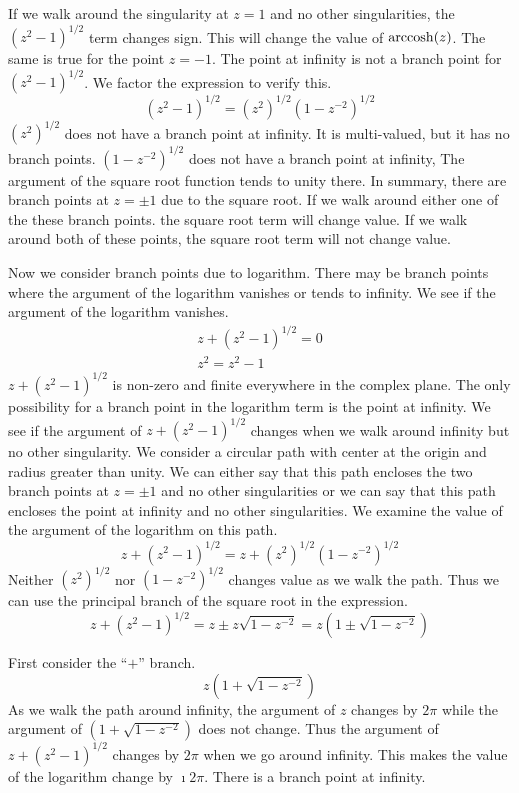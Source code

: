{\begin{Solution}
\begin{enumerate}
  If we walk around the singularity at $z = 1$ and no other singularities,
  the $\left( z^2 - 1 \right)^{1/2}$ term changes sign.  This will change the
  value of $\mathop{\mathrm{arccosh}}\nolimits(z)$.  The same is true for the point $z = -1$.
  The point at infinity is not a branch point for $\left( z^2 - 1 \right)^{1/2}$.
  We factor the expression to verify this.
  \[
  \left( z^2 - 1 \right)^{1/2}
  = \left( z^2 \right)^{1/2} \left( 1 - z^{-2} \right)^{1/2}
  \]
  $\left( z^2 \right)^{1/2}$ does not have a branch point at infinity.  It is 
  multi-valued, but it has no branch points.
  $\left( 1 - z^{-2} \right)^{1/2}$ does not have a branch point at infinity,
  The argument of the square root function tends to unity there.
  In summary, there are branch points at $z = \pm 1$ due to the square root.
  If we walk around either one of the these branch points. the square root
  term will change value.  If we walk around both of these points, the square 
  root term will not change value.

  Now we consider branch points due to logarithm.  There may be branch 
  points where the argument of the logarithm vanishes or tends to infinity.
  We see if the argument of the logarithm vanishes.
  \begin{gather*}
    z + \left( z^2 - 1 \right)^{1/2} = 0
    \\
    z^2 = z^2 - 1
  \end{gather*}
  $z + \left( z^2 - 1 \right)^{1/2}$ is non-zero and finite everywhere in 
  the complex plane.  The only possibility for a branch point in the 
  logarithm term is the point at infinity.  We see if the argument of 
  $z + \left( z^2 - 1 \right)^{1/2}$ changes when we walk around infinity
  but no other singularity.  We consider a circular path with center at the
  origin and radius greater than unity.  We can either say that this path
  encloses the two branch points at $z = \pm 1$ and no other singularities
  or we can say that this path encloses the point at infinity and no other 
  singularities.  We examine the value of the argument of the logarithm 
  on this path.
  \[
  z + \left( z^2 - 1 \right)^{1/2} 
  = z + \left( z^2 \right)^{1/2} \left( 1 - z^{-2} \right)^{1/2} 
  \]
  Neither $\left( z^2 \right)^{1/2}$ nor $\left( 1 - z^{-2} \right)^{1/2}$ changes 
  value as we walk the path.  Thus we can use the principal branch of the 
  square root in the expression.
  \[
  z + \left( z^2 - 1 \right)^{1/2} 
  = z \pm z \sqrt{1 - z^{-2}}
  = z \left( 1 \pm \sqrt{1 - z^{-2}} \right)
  \]

  First consider the ``$+$'' branch.
  \[
  z \left( 1 + \sqrt{1 - z^{-2}} \right)
  \]
  As we walk the path around infinity, the argument of $z$ changes by $2 \pi$
  while the argument of $\left( 1 + \sqrt{1 - z^{-2}} \right)$ does not change.
  Thus the argument of $z + \left( z^2 - 1 \right)^{1/2}$ changes by $2 \pi$ when 
  we go around infinity.  This makes the value of the logarithm change by 
  $\imath 2 \pi$.  There is a branch point at infinity.


\end{enumerate}
\end{Solution}}
